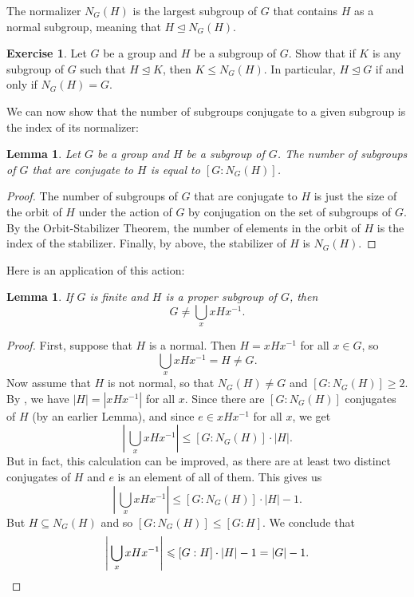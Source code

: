 \documentclass[12pt]{report}
\newtheorem{lemma}[theorem]{Lemma}
\numberwithin{equation}{section}
\numberwithin{theorem}{chapter}
\theoremstyle{definition}
\newtheorem{exercise}{Exercise}
\newtheorem*{basic properties}{Basic Properties}
\newtheorem*{Important Remark}{Important Remark}
\begin{document}
The normalizer $N_G(H)$ is the largest subgroup of $G$ that contains $H$ as a normal subgroup, meaning that $H \trianglelefteq N_G(H)$. 


\begin{exercise}
	Let $G$ be a group and $H$ be a subgroup of $G$. Show that if $K$ is any subgroup of $G$ such that $H \trianglelefteq K$, then $K \leq N_G(H)$. In particular, $H \trianglelefteq G$ if and only if $N_G(H) = G$.
\end{exercise}


We can now show that the number of subgroups conjugate to a given subgroup is the index of its normalizer:

\begin{lemma}\label{number of conjugates of H is index of the normalizer}
Let $G$ be a group and $H$ be a subgroup of $G$. The number of subgroups of $G$ that are conjugate to $H$ is equal to $[G: N_G(H)]$.
\end{lemma}

\begin{proof}
The number of subgroups of $G$ that are conjugate to $H$ is just the size of the orbit of $H$ under the action of $G$ by conjugation on the set of subgroups of $G$. 
	By the Orbit-Stabilizer Theorem, the number of elements in the orbit of $H$ is the index of the stabilizer. Finally, by above, the stabilizer of $H$ is $N_G(H)$.
\end{proof}




Here is an application of this action:

\begin{lemma} 
If $G$ is finite and $H$ is a proper subgroup of $G$, then 
$$G \neq \bigcup_x xHx^{-1}.$$
\end{lemma}


\begin{proof}
First, suppose that $H$ is a normal. Then $H = xHx^{-1}$ for all $x \in G$, so
$$\bigcup_x xHx^{-1} = H \neq G.$$
Now assume that $H$ is not normal, so that $N_G(H) \neq G$ and $[G: N_G(H)] \geqslant 2$. 
By , we have $|H| = |xHx^{-1}|$ for all $x$. Since there are $[G: N_G(H)]$ conjugates of $H$ (by an earlier Lemma), and since $e \in xHx^{-1}$ for all $x$, 
  we get
  $$\left| \, \bigcup_x xHx^{-1} \right| \leqslant [G:N_G(H)] \cdot |H|.$$
  But in fact, this calculation can be improved, as there are at least two distinct conjugates of $H$ and $e$ is an element of all of them. This gives us
  $$\left| \, \bigcup_x xHx^{-1} \right| \leqslant [G:N_G(H)] \cdot |H| - 1.$$
  But $H \subseteq N_G(H)$ and so $[G: N_G(H)] \leq [G:H]$. We conclude that
  $$\left| \, \bigcup_x xHx^{-1} \right| \leqslant [G:H] \cdot |H| - 1  = |G| - 1.\qedhere$$
\end{proof}
\end{document}

